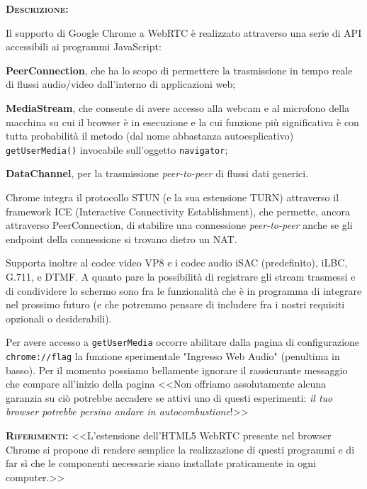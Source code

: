 
\begin{description}
	\item{\scshape\bfseries Descrizione:}
  
Il supporto di Google Chrome a WebRTC è realizzato attraverso una serie di API accessibili ai programmi JavaScript:
\begin{description}
\item{\bfseries PeerConnection}, che ha lo scopo di permettere la trasmissione in tempo reale di flussi audio/video dall'interno di applicazioni web;
\item{\bfseries MediaStream}, che consente di avere accesso alla webcam e al microfono della macchina su cui il browser è in esecuzione e la cui funzione più significativa è con tutta probabilità il metodo (dal nome abbastanza autoesplicativo) \texttt{getUserMedia()} invocabile sull'oggetto \texttt{navigator};
\item{\bfseries DataChannel}, per la trasmissione \textit{peer-to-peer} di flussi dati generici.
\end{description}

Chrome integra il protocollo STUN (e la sua estensione TURN) attraverso il framework ICE (Interactive Connectivity Establishment), che permette, ancora attraverso PeerConnection, di stabilire una connessione \textit{peer-to-peer} anche se gli endpoint della connessione si trovano dietro un NAT\@. 

Supporta inoltre al codec video VP8 e i codec audio iSAC (predefinito), iLBC, G.711, e DTMF\@. A quanto pare la possibilità di registrare gli stream trasmessi e di condividere lo schermo sono fra le funzionalità che è in programma di integrare nel prossimo futuro (e che potremmo pensare di includere fra i nostri requisiti opzionali o desiderabili).

Per avere accesso a \texttt{getUserMedia} occorre abilitare dalla pagina di configurazione \texttt{chrome://flag} la funzione sperimentale "Ingresso Web Audio" (penultima in basso). Per il momento possiamo bellamente ignorare il rassicurante messaggio che compare all'inizio della pagina <<Non offriamo assolutamente alcuna garanzia su ciò potrebbe accadere se attivi uno di questi esperimenti: \textit{il tuo browser potrebbe persino andare in autocombustione}!>>
	\item{\scshape\bfseries Riferimenti:}
  <<L'estensione dell'HTML5 WebRTC presente nel browser Chrome si propone di rendere semplice la realizzazione di questi programmi e di far sì che le
componenti necessarie siano installate praticamente in ogni computer.>>


\end{description}

